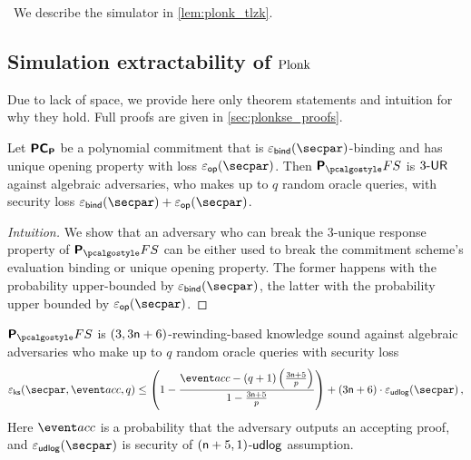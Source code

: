 \ 
We describe the simulator in \cref{lem:plonk_tlzk}.

\subsection{Simulation extractability of $\textnormal{{Plonk}}${}}
Due to lack of space, we provide here only theorem statements and intuition for why they hold. Full proofs are given in \cref{sec:plonkse_proofs}.

\begin{lemma}
	\label{lem:plonkprot_ur}
	Let $\bm{\mathsf{PC}}_{\bm{\mathsf{P}}}$ be a polynomial commitment that is $\epsbind(\secpar)$-binding and has unique opening property with loss $\epsop (\secpar)$. Then $\plonkprotfs$ is ${3\text{-}\mathsf{UR}}$ against algebraic adversaries, who makes up to $q$ random oracle queries, with security loss $\epsbinding (\secpar) + \epsop ( \secpar )$.
\end{lemma}
\begin{proof}[Intuition]
  We show that an adversary who can break the $3$-unique response property of $\plonkprotfs$ can be either used to break the commitment scheme's evaluation binding or unique opening property. The former happens with the probability upper-bounded by $\epsbinding (\secpar)$, the latter with the probability upper bounded by $\epsop (\secpar)$. 
  
\end{proof}

\begin{lemma}
	\label{lem:plonkprot_ss}
  $\plonkprotfs$ is $(3, 3 \mathsf{n} + 6)$-rewinding-based knowledge sound against algebraic adversaries who make up to $q$ random oracle queries with security loss 
  \[
    \epscss(\secpar,\accProb, q) \leq \left(1 - \frac{\accProb - (q + 1) \left(\frac{3 \noofc + 5}{p} \right)}{1 - \frac{3 \noofc + 5}{p}}\right) + (3 \noofc + 6) \cdot \epsudlog (\secpar) %
    \,,
  \]
	Here $\accProb$ is a probability that the adversary outputs an accepting proof, 
  and $\epsudlog(\secpar)$ is security of $(\mathsf{n} + 5, 1)$-$\mathsf{udlog}$ 
	assumption.
\end{lemma}

